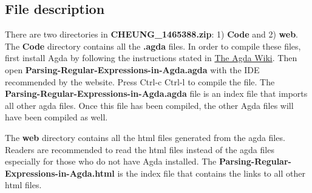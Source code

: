 \documentclass[twoside,openright,final]{bhamthesis}
\begin{document}
\tableofcontents















\newpage
\nocite{*}




\begin{appendices}
\chapter{File description}

\par There are two directories in \textbf{CHEUNG\_1465388.zip}: 1) \textbf{Code} and 2)
\textbf{web}. The \textbf{Code} directory contains all the
\textbf{.agda} files. In order to compile these files, first install
Agda by following the instructions stated in
\href{http://wiki.portal.chalmers.se/agda/pmwiki.php?n=Main.Download}{The
Agda Wiki}. Then open
\textbf{Parsing-Regular-Expressions-in-Agda.agda} with the IDE
recommended by the website. Press Ctrl-c Ctrl-l to compile the
file. The \textbf{Parsing-Regular-Expressions-in-Agda.agda} file is an
index file that imports all other agda files. Once this file has been
compiled, the other Agda files will have been compiled as well. 
\par The \textbf{web} directory contains all the html files generated
from the agda files. Readers are recommended to read the html files
instead of the agda files especially for those who do not have Agda
installed. The \textbf{Parsing-Regular-Expressions-in-Agda.html} is
the index file that contains the links to all other html files. 
\end{appendices}
\end{document}

